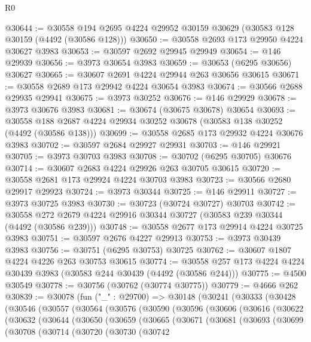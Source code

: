 \begin{lexlean}{R0}
\begin{coremodule}
@30644 := @30558 @194 @2695 @4224 @29952 @30159 @30629 (@30583 @128 @30159 (@4492 (@30586 @128)))
@30650 := @30558 @2693 @173 @29950 @4224 @30627 @3983
@30653 := @30597 @2692 @29945 @29949
@30654 := @146 @29939
@30656 := @3973 @30654 @3983
@30659 := @30653 (@6295 @30656) @30627
@30665 := @30607 @2691 @4224 @29944 @263 @30656 @30615
@30671 := @30558 @2689 @173 @29942 @4224 @30654 @3983
@30674 := @30566 @2688 @29935 @29941
@30675 := @3973 @30252
@30676 := @146 @29929
@30678 := @3973 @30676 @3983
@30681 := @30674 (@30675 @30678) @30654
@30693 := @30558 @188 @2687 @4224 @29934 @30252 @30678 (@30583 @138 @30252 (@4492 (@30586 @138)))
@30699 := @30558 @2685 @173 @29932 @4224 @30676 @3983
@30702 := @30597 @2684 @29927 @29931
@30703 := @146 @29921
@30705 := @3973 @30703 @3983
@30708 := @30702 (@6295 @30705) @30676
@30714 := @30607 @2683 @4224 @29926 @263 @30705 @30615
@30720 := @30558 @2681 @173 @29924 @4224 @30703 @3983
@30723 := @30566 @2680 @29917 @29923
@30724 := @3973 @30344
@30725 := @146 @29911
@30727 := @3973 @30725 @3983
@30730 := @30723 (@30724 @30727) @30703
@30742 := @30558 @272 @2679 @4224 @29916 @30344 @30727 (@30583 @239 @30344 (@4492 (@30586 @239)))
@30748 := @30558 @2677 @173 @29914 @4224 @30725 @3983
@30751 := @30597 @2676 @4227 @29913
@30753 := @3973 @30439 @3983
@30756 := @30751 (@6295 @30753) @30725
@30762 := @30607 @1807 @4224 @4226 @263 @30753 @30615
@30774 := @30558 @257 @173 @4224 @4224 @30439 @3983 (@30583 @244 @30439 (@4492 (@30586 @244)))
@30775 := @4500 @30549
@30778 := @30756 (@30762 (@30774 @30775))
@30779 := @4666 @262
@30839 := @30078
    (fun ("_" : @29700) =>
    @30148
      (@30241
        (@30333
          (@30428
            (@30546
              (@30557
                (@30564
                  (@30576
                    (@30590
                      (@30596
                        (@30606
                          (@30616
                            (@30622
                              (@30632
                                (@30644
                                  (@30650
                                    (@30659
                                      (@30665
                                        (@30671
                                          (@30681
                                            (@30693
                                              (@30699
                                                (@30708
                                                  (@30714
                                                    (@30720
                                                      (@30730
                                                        (@30742

\end{coremodule}
\end{lexlean}
